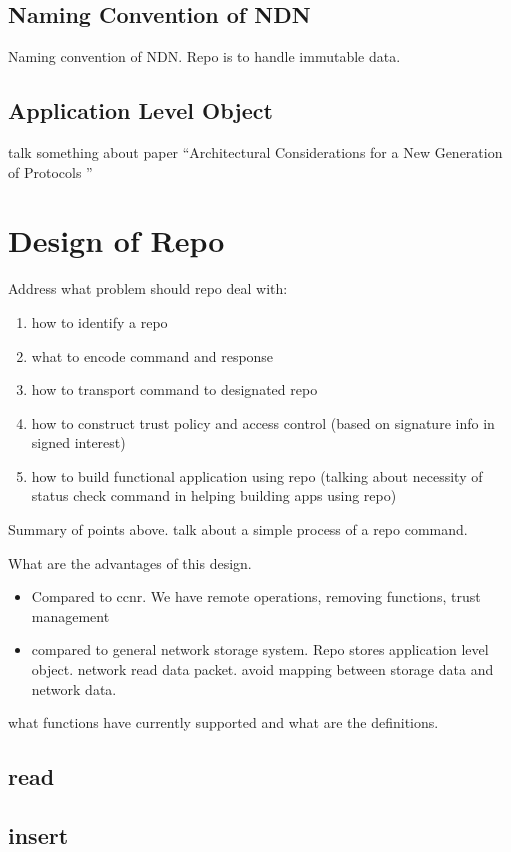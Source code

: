 \documentclass[conference]{IEEEtran}
\begin{document}
\subsection{Naming Convention of NDN}
Naming convention of NDN. Repo is to handle immutable data.

\subsection{Application Level Object}
talk something about paper ``Architectural  Considerations  for  a  New  Generation  of  Protocols ''

\section{Design of Repo}
Address what problem should repo deal with:
\begin{enumerate}
\item how to identify a repo
\item what to encode command and response
\item how to transport command to designated repo
\item how to construct trust policy and access control (based on signature info in signed interest)
\item how to build functional application using repo (talking about necessity of status check command in helping building apps using repo)
\end{enumerate}

Summary of points above. talk about a simple process of a repo command.

What are the advantages of this design.

\begin{itemize}
\item Compared to ccnr. We have remote operations, removing functions, trust management
\item compared to general network storage system. Repo stores application level object. network read data packet. avoid mapping between storage data and network data.
\end{itemize}

what functions have currently supported and what are the definitions.

\subsection{read}

\subsection{insert}
\end{document}
